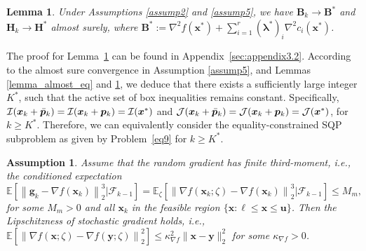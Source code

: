 \documentclass[aos]{imsart}
\numberwithin{equation}{section}
\theoremstyle{plain}
\newtheorem{assumption}{Assumption}
\newtheorem{lemma}{Lemma}
\begin{document}
\begin{lemma}
\label{lemma_almostsure_HB}
    Under Assumptions \ref{assump2} and \ref{assump5}, we have  $\bm{B}_k \to \bm{B}^{*}$ and $\bm{H}_k \to \bm{H}^{*}$ almost surely, where $\bm{B}^{*} := \nabla^2 f(\bm{x}^{*}) + \sum_{i=1}^{r} (\bm{\lambda}^{*})_{i} \nabla^2 c_i(\bm{x}^{*})$.
\end{lemma}

The proof for Lemma~\ref{lemma_almostsure_HB} can be found in Appendix~\ref{sec:appendix3.2}. According to the almost sure convergence in Assumption \ref{assump5}, and Lemmas \ref{lemma_almost_eq} and \ref{lemma_almostsure_HB}, we deduce that there exists a sufficiently large integer $K^{*}$, such that the active set of box inequalities remains constant. Specifically, $\mathcal{I}(\bm{x}_k + \Bar{\bm{p}}_k) = \mathcal{I}(\bm{x}_k + \bm{p}_k) = \mathcal{I}(\bm{x}^{*})$ and $\mathcal{J}(\bm{x}_k + \Bar{\bm{p}}_k) = \mathcal{J}(\bm{x}_k + \bm{p}_k) = \mathcal{J}(\bm{x}^{*})$, for $k \geq K^{*}$. Therefore, we can equivalently consider the equality-constrained SQP subproblem as given by Problem~\eqref{eq9} for $k \geq K^{*}$.



\begin{assumption}
\label{assump9}
Assume that the random gradient has finite third-moment, i.e., the conditioned expectation 
$$\mathbb{E}\left[ \left\|\bm{g}_k - \nabla f(\bm{x}_k) \right\|_2^3 | \mathcal{F}_{k-1} \right] = \mathbb{E}_{\zeta}\left[ \left\| \nabla f(\bm{x}_k; \zeta)  - \nabla f(\bm{x}_k) \right\|_2^3 | \mathcal{F}_{k-1} \right] \leq M_{m},$$ 
for some $M_{m}>0$ and all $\bm{x}_k$ in the feasible region $\{\bm{x}: \bm{\ell} \leq \bm{x} \leq \bm{u}\}$. Then the Lipschitzness of stochastic gradient holds, i.e., $\mathbb{E}\left[ \left\| \nabla f(\bm{x};\zeta) - \nabla f(\bm{y};\zeta) \right\|_2^2 \right] \leq \kappa_{\nabla f}^2 \|\bm{x} - \bm{y}\|_2^2$ for some $\kappa_{\nabla f} > 0$.
\end{assumption}
\end{document}
